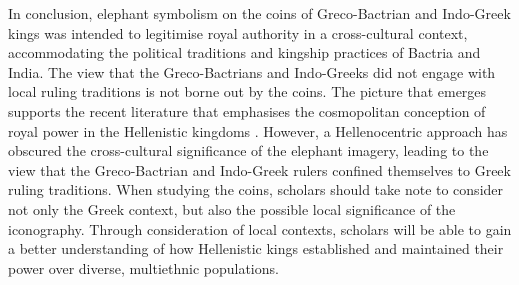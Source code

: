 \documentclass{ijsra}
\begin{document}
In conclusion, elephant symbolism on the coins of Greco-Bactrian and Indo-Greek kings was intended to legitimise
royal authority in a cross-cultural context, accommodating the political traditions and kingship practices of Bactria and India.
The view that the Greco-Bactrians and Indo-Greeks did not engage with local ruling traditions is not borne out by the coins.
The picture that emerges supports the recent literature that emphasises the cosmopolitan conception of royal power in
the Hellenistic kingdoms \parencite[11]{Strootman2014}.
However, a Hellenocentric approach has obscured the cross-cultural significance of the elephant imagery,
leading to the view that the Greco-Bactrian and Indo-Greek rulers confined themselves to Greek ruling traditions. 
When studying the coins, scholars should take note to consider not only the Greek context,
but also the possible local significance of the iconography. 
Through consideration of local contexts, scholars will be able to gain a better understanding of how Hellenistic kings
established and maintained their power over diverse, multiethnic populations.
\IJSRAclosing%
\end{document}
